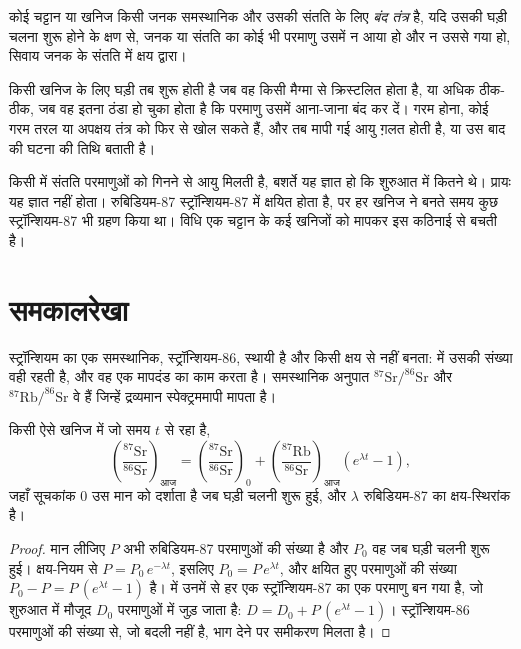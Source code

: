 \begin{definition}[बंद तंत्र]\label{def:g12:age-of-the-earth:closed-system}
कोई चट्टान या खनिज किसी जनक समस्थानिक और उसकी संतति के लिए \emph{बंद तंत्र}
है, यदि उसकी घड़ी चलना शुरू होने के क्षण से,
जनक या संतति का कोई भी परमाणु उसमें न आया हो और न उससे गया हो, सिवाय
जनक के संतति में क्षय द्वारा।
\end{definition}

किसी खनिज के लिए घड़ी तब शुरू होती है जब वह किसी मैग्मा से क्रिस्टलित होता है, या अधिक
ठीक-ठीक, जब वह इतना ठंडा हो चुका होता है कि परमाणु उसमें आना-जाना बंद कर दें।
गरम होना, कोई गरम
तरल या अपक्षय तंत्र को फिर से खोल सकते हैं, और तब मापी गई आयु
ग़लत होती है, या उस बाद की घटना की तिथि बताती है।

किसी  में संतति परमाणुओं को गिनने से आयु मिलती है, बशर्ते यह
ज्ञात हो कि शुरुआत में कितने थे। प्रायः यह ज्ञात नहीं होता। रुबिडियम-87
स्ट्रॉन्शियम-87 में क्षयित होता है, पर हर खनिज ने बनते समय कुछ स्ट्रॉन्शियम-87
भी ग्रहण किया था।  विधि एक चट्टान के कई खनिजों को मापकर
इस कठिनाई से बचती है।

\section{समकालरेखा}

स्ट्रॉन्शियम का एक समस्थानिक, स्ट्रॉन्शियम-86, स्थायी है और किसी
क्षय से नहीं बनता:  में उसकी संख्या वही रहती है, और वह एक
मापदंड का काम करता है। समस्थानिक अनुपात $^{87}\mathrm{Sr}/^{86}\mathrm{Sr}$ और
$^{87}\mathrm{Rb}/^{86}\mathrm{Sr}$ वे हैं जिन्हें द्रव्यमान स्पेक्ट्रममापी मापता है।

\begin{theorem}\label{thm:g12:age-of-the-earth:isochron}
किसी ऐसे खनिज में जो समय $t$ से  रहा है,
\[
  \left(\frac{^{87}\mathrm{Sr}}{^{86}\mathrm{Sr}}\right)_{\text{आज}}
  = \left(\frac{^{87}\mathrm{Sr}}{^{86}\mathrm{Sr}}\right)_{0}
  + \left(\frac{^{87}\mathrm{Rb}}{^{86}\mathrm{Sr}}\right)_{\text{आज}}
  \left(e^{\lambda t} - 1\right),
\]
जहाँ सूचकांक 0 उस मान को दर्शाता है जब घड़ी चलनी शुरू हुई, और $\lambda$
रुबिडियम-87 का क्षय-स्थिरांक है।
\end{theorem}

\begin{proof}
मान लीजिए $P$ अभी रुबिडियम-87 परमाणुओं की संख्या है और $P_0$ वह जब घड़ी
चलनी शुरू हुई। क्षय-नियम से $P = P_0\,e^{-\lambda t}$, इसलिए $P_0 = P\,e^{\lambda t}$,
और क्षयित हुए परमाणुओं की संख्या $P_0 - P = P\,(e^{\lambda t}-1)$ है।
 में उनमें से हर एक स्ट्रॉन्शियम-87 का एक परमाणु बन गया है, जो
शुरुआत में मौजूद $D_0$ परमाणुओं में जुड़ जाता है: $D = D_0 + P\,(e^{\lambda
t}-1)$। स्ट्रॉन्शियम-86 परमाणुओं की संख्या से, जो बदली नहीं है, भाग देने पर
समीकरण मिलता है।
\end{proof}

